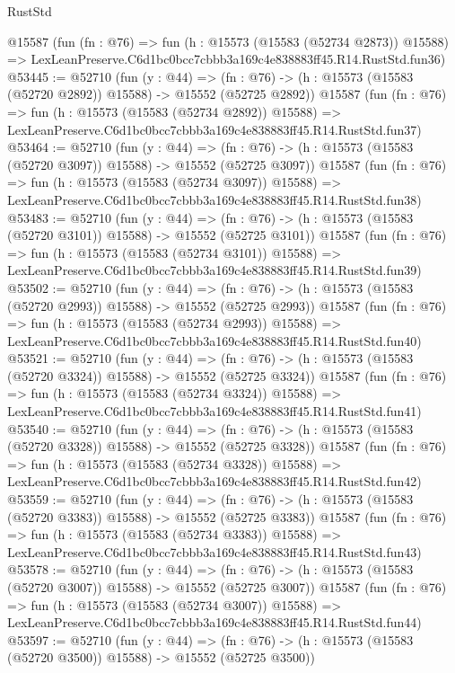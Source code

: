 \begin{lexlean}{RustStd}
\begin{coremodule}
    @15587
    (fun (fn : @76) =>
    fun (h : @15573 (@15583 (@52734 @2873)) @15588) =>
    LexLeanPreserve.C6d1bc0bcc7cbbb3a169c4e838883ff45.R14.RustStd.fun36)
@53445 := @52710
    (fun (y : @44) =>
    (fn : @76) -> (h : @15573 (@15583 (@52720 @2892)) @15588) -> @15552 (@52725 @2892))
    @15587
    (fun (fn : @76) =>
    fun (h : @15573 (@15583 (@52734 @2892)) @15588) =>
    LexLeanPreserve.C6d1bc0bcc7cbbb3a169c4e838883ff45.R14.RustStd.fun37)
@53464 := @52710
    (fun (y : @44) =>
    (fn : @76) -> (h : @15573 (@15583 (@52720 @3097)) @15588) -> @15552 (@52725 @3097))
    @15587
    (fun (fn : @76) =>
    fun (h : @15573 (@15583 (@52734 @3097)) @15588) =>
    LexLeanPreserve.C6d1bc0bcc7cbbb3a169c4e838883ff45.R14.RustStd.fun38)
@53483 := @52710
    (fun (y : @44) =>
    (fn : @76) -> (h : @15573 (@15583 (@52720 @3101)) @15588) -> @15552 (@52725 @3101))
    @15587
    (fun (fn : @76) =>
    fun (h : @15573 (@15583 (@52734 @3101)) @15588) =>
    LexLeanPreserve.C6d1bc0bcc7cbbb3a169c4e838883ff45.R14.RustStd.fun39)
@53502 := @52710
    (fun (y : @44) =>
    (fn : @76) -> (h : @15573 (@15583 (@52720 @2993)) @15588) -> @15552 (@52725 @2993))
    @15587
    (fun (fn : @76) =>
    fun (h : @15573 (@15583 (@52734 @2993)) @15588) =>
    LexLeanPreserve.C6d1bc0bcc7cbbb3a169c4e838883ff45.R14.RustStd.fun40)
@53521 := @52710
    (fun (y : @44) =>
    (fn : @76) -> (h : @15573 (@15583 (@52720 @3324)) @15588) -> @15552 (@52725 @3324))
    @15587
    (fun (fn : @76) =>
    fun (h : @15573 (@15583 (@52734 @3324)) @15588) =>
    LexLeanPreserve.C6d1bc0bcc7cbbb3a169c4e838883ff45.R14.RustStd.fun41)
@53540 := @52710
    (fun (y : @44) =>
    (fn : @76) -> (h : @15573 (@15583 (@52720 @3328)) @15588) -> @15552 (@52725 @3328))
    @15587
    (fun (fn : @76) =>
    fun (h : @15573 (@15583 (@52734 @3328)) @15588) =>
    LexLeanPreserve.C6d1bc0bcc7cbbb3a169c4e838883ff45.R14.RustStd.fun42)
@53559 := @52710
    (fun (y : @44) =>
    (fn : @76) -> (h : @15573 (@15583 (@52720 @3383)) @15588) -> @15552 (@52725 @3383))
    @15587
    (fun (fn : @76) =>
    fun (h : @15573 (@15583 (@52734 @3383)) @15588) =>
    LexLeanPreserve.C6d1bc0bcc7cbbb3a169c4e838883ff45.R14.RustStd.fun43)
@53578 := @52710
    (fun (y : @44) =>
    (fn : @76) -> (h : @15573 (@15583 (@52720 @3007)) @15588) -> @15552 (@52725 @3007))
    @15587
    (fun (fn : @76) =>
    fun (h : @15573 (@15583 (@52734 @3007)) @15588) =>
    LexLeanPreserve.C6d1bc0bcc7cbbb3a169c4e838883ff45.R14.RustStd.fun44)
@53597 := @52710
    (fun (y : @44) =>
    (fn : @76) -> (h : @15573 (@15583 (@52720 @3500)) @15588) -> @15552 (@52725 @3500))

\end{coremodule}
\end{lexlean}
